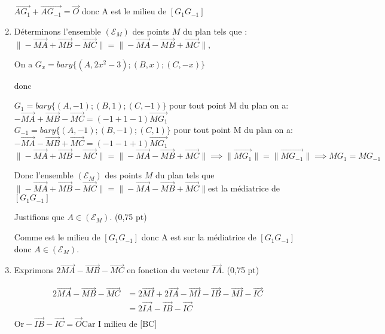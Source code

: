 \documentclass[12pt,a4paper]{article}
\begin{document}
\begin{enumerate}
$\overrightarrow{AG_1} + \overrightarrow{AG_{-1}}= \overrightarrow{O}$ donc A est le milieu de $[G_1G_{-1}]$
 \item Déterminons l’ensemble $(\mathscr{E}_M)$ des points $M$ du plan tels que :\\
    \(
    \|-\overrightarrow{MA} + \overrightarrow{MB} - \overrightarrow{MC}\| = \|-\overrightarrow{MA} - \overrightarrow{MB} + \overrightarrow{MC}\|,
    \)
    
On a $G_x=bary\{(A, 2x^2 - 3); (B, x); (C, -x)\}$ 

donc 

$G_1=bary\{(A, -1); (B, 1); (C, -1)\}$ pour tout point M du plan on a:\\

\(-\overrightarrow{MA} + \overrightarrow{MB} - \overrightarrow{MC} = (-1+1-1)\overrightarrow{MG_1} \)\\

$G_{-1}=bary\{(A, -1); (B, -1); (C, 1)\}$ pour tout point M du plan on a:\\

\( -\overrightarrow{MA} - \overrightarrow{MB} + \overrightarrow{MC} = (-1-1+1)\overrightarrow{MG_1} \)
\vspace{1cm}\\
\(
\|-\overrightarrow{MA} + \overrightarrow{MB} - \overrightarrow{MC}\| =  \|-\overrightarrow{MA} - \overrightarrow{MB} + \overrightarrow{MC}\| \implies \| \overrightarrow{MG_1} \| =\|\overrightarrow{MG_{-1}}\|\implies MG_1 =MG_{-1}
\)

Donc l’ensemble $(\mathscr{E}_M)$ des points $M$ du plan tels que \( \|-\overrightarrow{MA} + \overrightarrow{MB} - \overrightarrow{MC}\| = \|-\overrightarrow{MA} - \overrightarrow{MB} + \overrightarrow{MC}\|\)est la médiatrice de $[G_1G_{-1}]$

Justifions que $A \in (\mathscr{E}_M)$. \hfill (0,75 pt)

Comme est le milieu de $[G_1G_{-1}]$ donc A est sur la médiatrice de $[G_1G_{-1}]$ donc  $A \in (\mathscr{E}_M)$.

    \item Exprimons $2\overrightarrow{MA} - \overrightarrow{MB} - \overrightarrow{MC}$ en fonction du vecteur $\overrightarrow{IA}$. \hfill (0,75 pt)

\begin{align*}
2\overrightarrow{MA} - \overrightarrow{MB} - \overrightarrow{MC} &= 2\overrightarrow{MI}+2\overrightarrow{IA} - \overrightarrow{MI}-\overrightarrow{IB} - \overrightarrow{MI}-\overrightarrow{IC}\\
&=2\overrightarrow{IA}-\overrightarrow{IB}-\overrightarrow{IC}\\
\end{align*}
$\text{Or} -\overrightarrow{IB}-\overrightarrow{IC}=\overrightarrow{O} \text{Car I milieu de [BC]}$


\end{enumerate}
\end{document}
